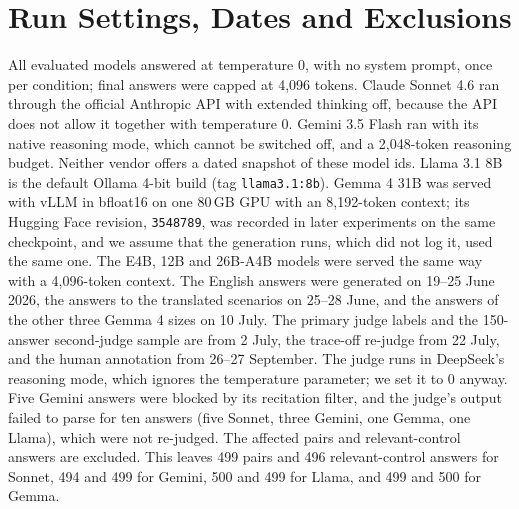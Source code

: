 \documentclass[11pt]{article}
\begin{document}
\section{Run Settings, Dates and Exclusions}
\label{app:settings}
All evaluated models answered at temperature 0, with no system prompt, once per condition; final answers
were capped at 4{,}096 tokens. Claude Sonnet 4.6 ran through the official Anthropic API with extended
thinking off, because the API does not allow it together with temperature 0. Gemini 3.5 Flash ran with
its native reasoning mode, which cannot be switched off, and a 2{,}048-token reasoning budget. Neither
vendor offers a dated snapshot of these model ids. Llama 3.1 8B is the default Ollama 4-bit build (tag
\texttt{llama3.1:8b}). Gemma 4 31B was served with vLLM in bfloat16 on one 80\,GB GPU with an
8{,}192-token context; its Hugging Face revision, \texttt{3548789}, was recorded in later experiments on
the same checkpoint, and we assume that the generation runs, which did not log it, used the same one.
The E4B, 12B and 26B-A4B models were served the same way with a 4{,}096-token context. The English
answers were generated on 19--25 June 2026, the answers to the translated scenarios on 25--28 June, and
the answers of the other three Gemma 4 sizes on 10 July. The primary judge labels and the 150-answer
second-judge sample are from 2 July, the trace-off re-judge from 22 July, and the human annotation from
26--27 September. The judge runs in DeepSeek's reasoning mode, which ignores the temperature parameter;
we set it to 0 anyway. Five Gemini answers were blocked by its recitation filter, and the judge's output
failed to parse for ten answers (five Sonnet, three Gemini, one Gemma, one Llama), which were not
re-judged. The affected pairs and relevant-control answers are excluded. This leaves 499 pairs and 496
relevant-control answers for Sonnet, 494 and 499 for Gemini, 500 and 499 for Llama, and 499 and 500 for
Gemma.
\end{document}
